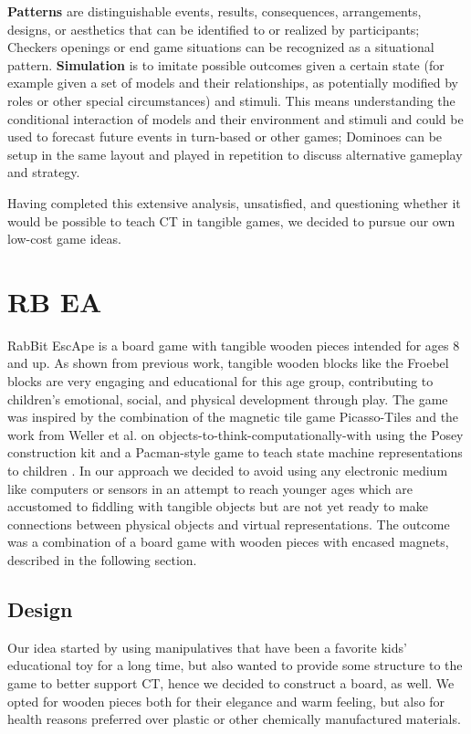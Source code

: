 \documentclass{acm_proc_article-sp}
\begin{document}
\textbf{Patterns} are distinguishable events, results, consequences, arrangements, designs, or aesthetics that can be identified to or realized by participants; Checkers openings or end game situations can be recognized as a situational pattern.
\textbf{Simulation} is to imitate possible outcomes given a certain state (for example given a set of models and their relationships, as potentially modified by roles or other special circumstances) and stimuli.
This means understanding the conditional interaction of models and their environment and stimuli and could be used to forecast future events in turn-based or other games; Dominoes can be setup in the same layout and played in repetition to discuss alternative gameplay and strategy.

Having completed this extensive analysis, unsatisfied, and questioning whether it would be possible to teach CT in tangible games, we decided to pursue our own low-cost game ideas.

\section{R{}B{} E{}A{}}
\label{sec:rabbit}
RabBit EscApe is a board game with tangible wooden pieces intended for ages 8 and up.
As shown from previous work, tangible wooden blocks like the Froebel blocks \cite{liebschner1992child} are very engaging and educational for this age group, contributing to children's emotional, social, and physical development through play.
The game was inspired by the combination of the magnetic tile game Picasso-Tiles \cite{picassotiles3d} and the work from Weller et al. on objects-to-think-computationally-with using the Posey construction kit and a Pacman-style game to teach state machine representations to children \cite{weller2008escape}.
In our approach we decided to avoid using any electronic medium like computers or sensors in an attempt to reach younger ages which are accustomed to fiddling with tangible objects but are not yet ready to make connections between physical objects and virtual representations.
The outcome was a combination of a board game with wooden pieces with encased magnets, described in the following section.

\subsection{Design}
\label{sec:design}
Our idea started by using manipulatives that have been a favorite kids' educational toy for a long time, but also wanted to provide some structure to the game to better support CT, hence we decided to construct a board, as well.
We opted for wooden pieces both for their elegance and warm feeling, but also for health reasons preferred over plastic or other chemically manufactured materials. 
\end{document}
